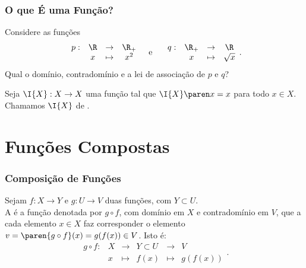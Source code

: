 \documentclass[brazil, notheorems, 10pt]{beamer}
\begin{document}
\begin{frame}
\frametitle{O que É uma Função?} %
\begin{Exem}
Considere as funções
$$\begin{array}{cccc}
p : & \R & \to     & \R_+ \\
		 &  x & \mapsto & x^2
\end{array}
\text{\ \ \  e \ \ \ }
\begin{array}{cccc}
q : & \R_+ & \to     & \R \\
		 &  x & \mapsto & \sqrt x
\end{array}.$$
Qual o domínio, contradomínio e a lei de associação de $p$ e $q$?
\end{Exem}
\pause

\begin{Exem}
Seja $\I{X} : X \to X $ uma função tal que $\I{X} \paren x = x$ para
todo $x \in X$. Chamamos $\I{X}$ de .
\end{Exem}

\end{frame}


\section{Funções Compostas}
\begin{frame}
\frametitle{Composição de Funções} %

\begin{Def}
Sejam $f: X \to Y$ e $g: U \to V$ duas funções, com $Y \subset U$.\\
A  é a função denotada por $g
\circ f$, com domínio em $X$ e contradomínio em $V$, que a cada
elemento $x \in X$ faz corresponder o elemento $v = \paren{g \circ
f}(x) = g(f(x)) \in V$. Isto é:
$$\begin{array}{cccccc}
g \circ f : & X & \to     & Y \subset U & \to & V \\
		 &  x & \mapsto & f(x) & \mapsto & g(f(x))
\end{array}.$$
\end{Def}

\end{frame}

\end{document}
